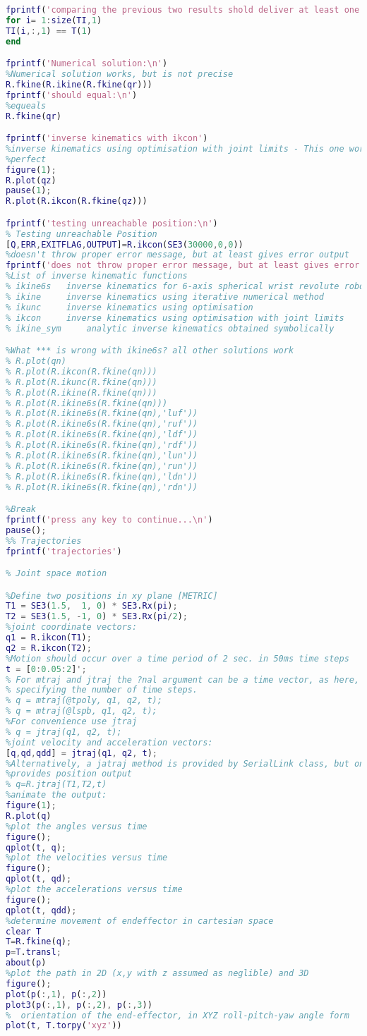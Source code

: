 \begin{lstlisting}[language=Matlab]
% One of these should be 1!!
fprintf('comparing the previous two results shold deliver at least one match:\n')
for i= 1:size(TI,1)
TI(i,:,1) == T(1)
end

fprintf('Numerical solution:\n')
%Numerical solution works, but is not precise
R.fkine(R.ikine(R.fkine(qr)))
fprintf('should equal:\n')
%equeals
R.fkine(qr)

fprintf('inverse kinematics with ikcon')
%inverse kinematics using optimisation with joint limits - This one works
%perfect
figure(1);
R.plot(qz)
pause(1);
R.plot(R.ikcon(R.fkine(qz)))

fprintf('testing unreachable position:\n')
% Testing unreachable Position
[Q,ERR,EXITFLAG,OUTPUT]=R.ikcon(SE3(30000,0,0))
%doesn't throw proper error message, but at least gives error output
fprintf('does not throw proper error message, but at least gives error output\n')
%List of inverse kinematic functions
% ikine6s 	inverse kinematics for 6-axis spherical wrist revolute robot
% ikine 	inverse kinematics using iterative numerical method
% ikunc 	inverse kinematics using optimisation
% ikcon 	inverse kinematics using optimisation with joint limits
% ikine_sym 	analytic inverse kinematics obtained symbolically

%What *** is wrong with ikine6s? all other solutions work
% R.plot(qn)
% R.plot(R.ikcon(R.fkine(qn)))
% R.plot(R.ikunc(R.fkine(qn)))
% R.plot(R.ikine(R.fkine(qn)))
% R.plot(R.ikine6s(R.fkine(qn)))
% R.plot(R.ikine6s(R.fkine(qn),'luf'))
% R.plot(R.ikine6s(R.fkine(qn),'ruf'))
% R.plot(R.ikine6s(R.fkine(qn),'ldf'))
% R.plot(R.ikine6s(R.fkine(qn),'rdf'))
% R.plot(R.ikine6s(R.fkine(qn),'lun'))
% R.plot(R.ikine6s(R.fkine(qn),'run'))
% R.plot(R.ikine6s(R.fkine(qn),'ldn'))
% R.plot(R.ikine6s(R.fkine(qn),'rdn'))

%Break 
fprintf('press any key to continue...\n')
pause();
%% Trajectories
fprintf('trajectories')

% Joint space motion

%Define two positions in xy plane [METRIC]
T1 = SE3(1.5,  1, 0) * SE3.Rx(pi); 
T2 = SE3(1.5, -1, 0) * SE3.Rx(pi/2);  
%joint coordinate vectors:
q1 = R.ikcon(T1);
q2 = R.ikcon(T2);
%Motion should occur over a time period of 2 sec. in 50ms time steps
t = [0:0.05:2]';
% For mtraj and jtraj the ?nal argument can be a time vector, as here, or an integer 
% specifying the number of time steps.
% q = mtraj(@tpoly, q1, q2, t);
% q = mtraj(@lspb, q1, q2, t);
%For convenience use jtraj
% q = jtraj(q1, q2, t);
%joint velocity and acceleration vectors:
[q,qd,qdd] = jtraj(q1, q2, t); 
%Alternatively, a jatraj method is provided by SerialLink class, but only
%provides position output
% q=R.jtraj(T1,T2,t)
%animate the output:
figure(1);
R.plot(q)
%plot the angles versus time
figure();
qplot(t, q); 
%plot the velocities versus time
figure();
qplot(t, qd); 
%plot the accelerations versus time
figure();
qplot(t, qdd); 
%determine movement of endeffector in cartesian space
clear T
T=R.fkine(q);
p=T.transl;
about(p)
%plot the path in 2D (x,y with z assumed as neglible) and 3D
figure();
plot(p(:,1), p(:,2))
plot3(p(:,1), p(:,2), p(:,3))
%  orientation of the end-effector, in XYZ roll-pitch-yaw angle form
plot(t, T.torpy('xyz'))


\end{lstlisting}
